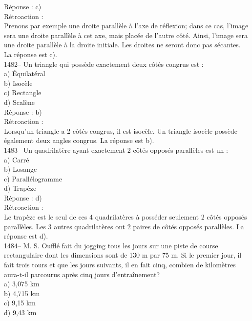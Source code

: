 R\'eponse : c)\\

R\'etroaction :\\
Prenons par exemple une droite parall\`ele \`a l'axe de r\'eflexion;
dans ce cas, l'image sera une droite parall\`ele \`a cet axe, mais
plac\'ee de l'autre c\^ot\'e. Ainsi, l'image sera une droite
parall\`ele \`a la droite initiale. Les droites ne seront donc pas
s\'ecantes.
La r\'eponse est c).\\

1482-- Un triangle qui poss\`ede exactement deux c\^ot\'es congrus est :\\
a) \'Equilat\'eral\\
b) Isoc\`ele\\
c) Rectangle\\
d) Scal\`ene\\

R\'eponse : b)\\

R\'etroaction :\\
Lorsqu'un triangle a 2 c\^ot\'es congrus, il est isoc\`ele. Un triangle
isoc\`ele poss\`ede \'egalement deux angles congrus. La r\'eponse est b).\\

1483-- Un quadrilat\`ere ayant exactement 2 c\^ot\'es oppos\'es
parall\`eles
est un :\\
a) Carr\'e\\
b) Losange\\
c) Parall\'elogramme\\
d) Trap\`eze\\

R\'eponse : d)\\

R\'etroaction :\\
Le trap\`eze est le seul de ces 4 quadrilat\`eres \`a poss\'eder
seulement 2 c\^ot\'es oppos\'es parall\`eles. Les 3 autres
quadrilat\`eres ont
2 paires de c\^ot\'es oppos\'es parall\`eles. La r\'eponse est d).\\

1484-- M. S. Ouffl\'e fait du jogging tous les jours sur une piste de
course rectangulaire dont les dimensions sont de 130 m par 75 m. Si
le premier jour, il fait trois tours et que les jours suivants, il
en fait cinq, combien de kilom\`etres aura-t-il parcourus apr\`es
cinq jours
d'entra\^inement?\\
a) 3,075 km\\
b) 4,715 km\\
c) 9,15 km\\
d) 9,43 km\\

